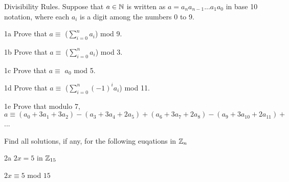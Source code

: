 \begin{question}{1}
Divisibility Rules. Suppose that $a \in \mathbb{N}$ is written as $a = a_na_{n-1}...a_1a_0$ in base 10 notation, where each $a_{i}$ is a digit among the numbers 0 to 9.
\end{question}


\begin{question}{1a}
Prove that $a\equiv$ ($\displaystyle\sum\limits_{i=0}^n a_i$) mod 9.
\end{question}

\begin{question}{1b}
Prove that $a\equiv$ ($\displaystyle\sum\limits_{i=0}^n a_i$) mod 3.
\end{question}

\begin{question}{1c}
Prove that $a\equiv$ $a_0$ mod 5.

\end{question}

\begin{question}{1d}
Prove that $a\equiv$ ($\displaystyle\sum\limits_{i=0}^n (-1)^i a_i$) mod 11.
\end{question}

\begin{question}{1e}
Prove that modulo 7, $a \equiv (a_0 + 3a_1 + 3a_2)-(a_3+3a_4+2a_5)+(a_6+3a_7+2a_8)-(a_9+3a_{10}+2a_{11})+$...
\end{question}



\begin{question}{2}
Find all solutions, if any, for the following euqations in $\mathbb{Z}_n$
\end{question}




%
%


\begin{question}{2a}
$2x = 5$ in $\mathbb{Z}_{15}$

$2x \equiv 5$ mod $15$\\



\end{question}

